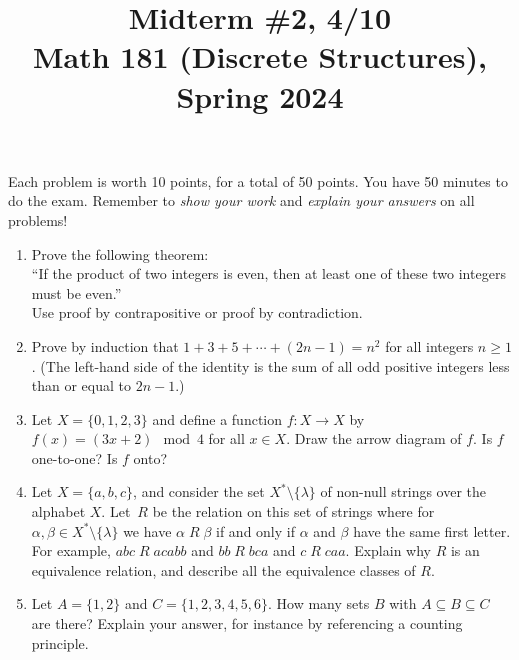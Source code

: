 \documentclass[11pt]{article}
\title{Midterm \#2, 4/10 \\Math 181 (Discrete Structures), Spring 2024}
\date{}
\begin{document}
\maketitle

\thispagestyle{empty}

\vspace{-1cm}

Each problem is worth 10 points, for a total of 50 points. You have 50 minutes to do the exam. Remember to \emph{show your work} and \emph{explain your answers} on all problems!

\begin{enumerate}

\item Prove the following theorem: \\``If the product of two integers is even, then at least one of these two integers must be even.'' \\Use proof by contrapositive or proof by contradiction.

\item Prove by induction that $1+3+5 + \cdots + (2n-1) = n^2$ for all integers $n\geq 1$. (The left-hand side of the identity is the sum of all odd positive integers less than or equal to $2n-1$.)

\item Let $X = \{0,1,2,3\}$ and define a function $f\colon X \to X$ by $f(x) = (3x + 2) \mod 4$ for all $x \in X$. Draw the arrow diagram of $f$. Is $f$ one-to-one? Is $f$ onto?

\item Let $X = \{a,b,c\}$, and consider the set $X^* \setminus \{\lambda\}$ of non-null strings over the alphabet $X$. Let~$R$ be the relation on this set of strings where for $\alpha, \beta \in X^* \setminus \{\lambda\}$ we have $\alpha \; R \; \beta$ if and only if $\alpha$ and $\beta$ have the same first letter. For example, $abc \; R \; acabb$ and $bb \; R \; bca$ and $c \; R \; caa$. Explain why $R$ is an equivalence relation, and describe all the equivalence classes of $R$.

\item Let $A = \{1,2\}$ and $C = \{1,2,3,4,5,6\}$. How many sets $B$ with $A \subseteq B \subseteq C$ are there? Explain your answer, for instance by referencing a counting principle.


\end{enumerate}
\end{document}
